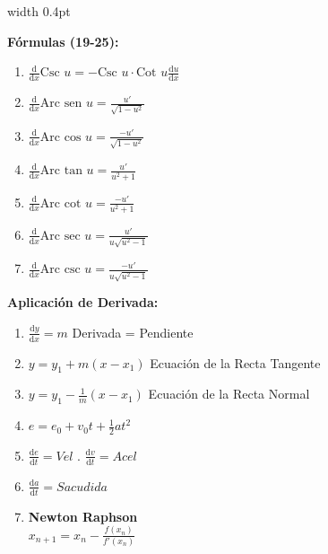 \documentclass[10pt, letterpaper, landscape]{article}
\newcommand{\dd}{\mathrm{d}}
\newcommand{\deriv}[2]{\frac{\dd#1}{\dd#2}}
\begin{document}
\hfill
\vrule width 0.4pt
\hfill
\begin{minipage}[t]{8.3cm}
    \textbf{Fórmulas (19-25):}
    \begin{enumerate}[label=\arabic*., start=19, nosep, itemsep=0pt, leftmargin=15pt]
        \item $\deriv{}{x} \text{Csc } u = -\text{Csc } u \cdot \text{Cot } u \deriv{u}{x}$
        \item $\deriv{}{x} \text{Arc sen } u = \frac{u'}{\sqrt{1-u^2}}$
        \item $\deriv{}{x} \text{Arc cos } u = \frac{-u'}{\sqrt{1-u^2}}$
        \item $\deriv{}{x} \text{Arc tan } u = \frac{u'}{u^2+1}$
        \item $\deriv{}{x} \text{Arc cot } u = \frac{-u'}{u^2+1}$
        \item $\deriv{}{x} \text{Arc sec } u = \frac{u'}{u\sqrt{u^2-1}}$
        \item $\deriv{}{x} \text{Arc csc } u = \frac{-u'}{u\sqrt{u^2-1}}$
    \end{enumerate}

    \vspace{0.2cm}
    \begin{tcolorbox}[colback=white, colframe=black, boxrule=0.5pt, arc=0pt, auto outer arc, left=2pt, right=2pt, top=2pt, bottom=2pt, boxsep=1pt, before=\vspace{4pt}, after=\vspace{4pt}]
        \textbf{\normalsize Aplicación de Derivada:}
        \begin{enumerate}[label=\arabic*., itemsep=2pt, leftmargin=12pt]
            \item $\frac{\dd y}{\dd x} = m$ \scriptsize{Derivada = Pendiente}
            \item $y = y_1 + m(x-x_1)$ \scriptsize{Ecuación de la Recta Tangente}
            \item $y = y_1 - \frac{1}{m}(x-x_1)$ \scriptsize{Ecuación de la Recta Normal}
            \item $e = e_0 + v_0t + \frac{1}{2}at^2$
            \item $\frac{\dd e}{\dd t} = Vel$ . $\frac{\dd v}{\dd t} = Acel$
            \item $\frac{\dd a}{\dd t} = Sacudida$
            \item \textbf{Newton Raphson} \\
            $x_{n+1} = x_n - \frac{f(x_n)}{f'(x_n)}$
        \end{enumerate}
    \end{tcolorbox}
\end{minipage}%
\end{document}
